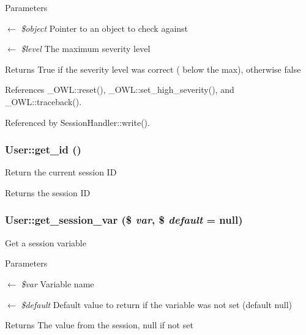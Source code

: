 \begin{DoxyParams}{Parameters}
\item[\mbox{$\leftarrow$} {\em \$object}]Pointer to an object to check against \item[\mbox{$\leftarrow$} {\em \$level}]The maximum severity level \end{DoxyParams}
\begin{DoxyReturn}{Returns}
True if the severity level was correct ( below the max), otherwise false 
\end{DoxyReturn}


References \_\-OWL::reset(), \_\-OWL::set\_\-high\_\-severity(), and \_\-OWL::traceback().



Referenced by SessionHandler::write().

\subsubsection[{get\_\-id}]{\setlength{\rightskip}{0pt plus 5cm}User::get\_\-id ()}\label{classUser_a21bee530c9f8304e9e74e274f0f655af}
Return the current session ID

\begin{DoxyReturn}{Returns}
the session ID 
\end{DoxyReturn}
\subsubsection[{get\_\-session\_\-var}]{\setlength{\rightskip}{0pt plus 5cm}User::get\_\-session\_\-var (\$ {\em var}, \/  \$ {\em default} = {\ttfamily null})}\label{classUser_a84f3693077e777cc1d61b45fcecdb36c}
Get a session variable


\begin{DoxyParams}{Parameters}
\item[\mbox{$\leftarrow$} {\em \$var}]Variable name \item[\mbox{$\leftarrow$} {\em \$default}]Default value to return if the variable was not set (default null) \end{DoxyParams}
\begin{DoxyReturn}{Returns}
The value from the session, null if not set 
\end{DoxyReturn}
